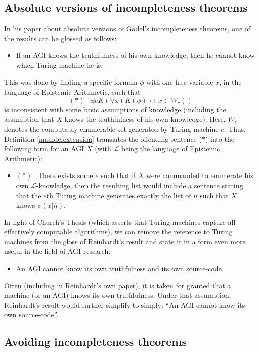 \documentclass[runningheads]{llncs}
\begin{document}
\subsection{Absolute versions of incompleteness theorems}

In his paper \cite{reinhardt1985absolute} about absolute versions of
G\"odel's incompleteness theorems, one of the results can be glossed as follows:
\begin{itemize}
  \item
  If an AGI knows the truthfulness of his own knowledge, then he cannot
  know which Turing machine he is.
\end{itemize}
This was done by finding a specific formula $\phi$ with one free variable $x$,
in the language of Epistemic Arithmetic,
such that
\[
  (*) \,\,\,\,\, \exists e K(\forall x (K(\phi)\leftrightarrow x\in W_e))
\]
is inconsistent with some basic assumptions of knowledge
(including the assumption that $X$ knows the truthfulness of his own knowledge).
Here, $W_e$ denotes the computably enumerable set generated by Turing machine $e$. Thus,
Definition \ref{maindefextension} translates the offending sentence ($*$) into the
following form
for an AGI $X$ (with $\mathscr L$ being the language of Epistemic Arithmetic):
\begin{itemize}
  \item
  $(*) \,\,\,\,\, $There exists some $e$ such that if $X$ were commanded to enumerate his own
  $\mathscr L$-knowledge, then the resulting list would include a sentence
  stating that the $e$th Turing machine generates exactly the list of $n$ such
  that $X$ knows $\phi(x|\overline n)$.
\end{itemize}

In light of Church's Thesis (which asserts that Turing machines capture all
effectively computable algorithms), we can remove the reference to Turing machines
from the gloss of Reinhardt's result and state it in a form even more useful
in the field of AGI research:
\begin{itemize}
  \item
  An AGI cannot know its own truthfulness and its own source-code.
\end{itemize}

Often (including in Reinhardt's own paper), it is taken for granted that
a machine (or an AGI) knows its own truthfulness.
Under that assumption, Reinhardt's result would further simplify to
simply: ``An AGI cannot know its own source-code''.

\subsection{Avoiding incompleteness theorems}
\end{document}
